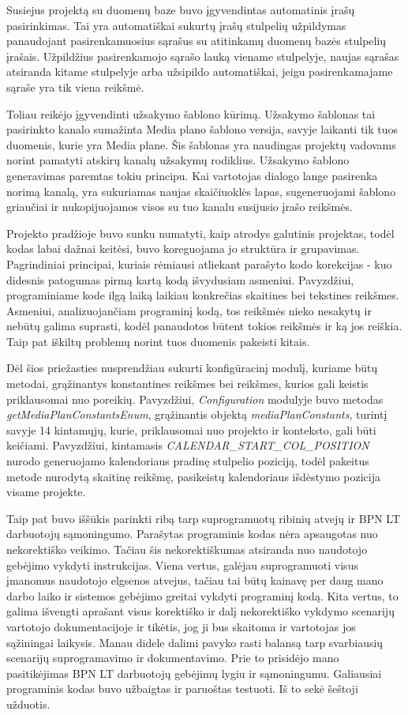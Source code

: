 \documentclass{VUMIFPSkursinis}
\begin{document}
Susiejus projektą su duomenų baze buvo įgyvendintas automatinis įrašų pasirinkimas. Tai yra automatiškai sukurtų įrašų stulpelių užpildymas panaudojant pasirenkamuosius sąrašus su atitinkamų duomenų bazės stulpelių įrašais. Užpildžius pasirenkamojo sąrašo lauką viename stulpelyje, naujas sąrašas atsiranda kitame stulpelyje arba užsipildo automatiškai, jeigu pasirenkamajame sąraše yra tik viena reikšmė. 

Toliau reikėjo įgyvendinti užsakymo šablono kūrimą. Užsakymo šablonas tai pasirinkto kanalo sumažinta Media plano šablono versija, savyje laikanti tik tuos duomenis, kurie yra Media plane. Šis šablonas yra naudingas projektų vadovams norint pamatyti atskirų kanalų užsakymų rodiklius. Užsakymo šablono generavimas paremtas tokiu principu. Kai vartotojas dialogo lange pasirenka norimą kanalą, yra sukuriamas naujas skaičiuoklės lapas, sugeneruojami šablono griaučiai ir nukopijuojamos visos su tuo kanalu susijusio įrašo reikšmės.

Projekto pradžioje buvo sunku numatyti, kaip atrodys galutinis projektas, todėl kodas labai dažnai keitėsi, buvo koreguojama jo struktūra ir grupavimas. Pagrindiniai principai, kuriais rėmiausi atliekant parašyto kodo korekcijas - kuo didesnis patogumas pirmą kartą kodą išvydusiam asmeniui. Pavyzdžiui, programiniame kode ilgą laiką laikiau konkrečias skaitines bei tekstines reikšmes. Asmeniui, analizuojančiam programinį kodą, tos reikšmės nieko nesakytų ir nebūtų galima suprasti, kodėl panaudotos būtent tokios reikšmės ir ką jos reiškia. Taip pat iškiltų problemų norint tuos duomenis pakeisti kitais.

Dėl šios priežasties nusprendžiau sukurti konfigūracinį modulį, kuriame būtų metodai, grąžinantys konstantines reikšmes bei reikšmes, kurios gali keistis priklausomai nuo poreikių. Pavyzdžiui, \textit{Configuration} modulyje buvo metodas \textit{getMediaPlanConstantsEnum}, grąžinantis objektą \textit{mediaPlanConstants}, turintį savyje 14 kintamųjų, kurie, priklausomai nuo projekto ir konteksto, gali būti keičiami. Pavyzdžiui, kintamasis \textit{CALENDAR\_START\_COL\_POSITION} nurodo generuojamo kalendoriaus pradinę stulpelio poziciją, todėl pakeitus metode nurodytą skaitinę reikšmę, pasikeistų kalendoriaus išdėstymo pozicija visame projekte.

Taip pat buvo iššūkis parinkti ribą tarp suprogramuotų ribinių atvejų ir BPN LT darbuotojų sąmoningumo. Parašytas programinis kodas nėra apsaugotas nuo nekorektiško veikimo. Tačiau šis nekorektiškumas atsiranda nuo naudotojo gebėjimo vykdyti instrukcijas. Viena vertus, galėjau suprogramuoti visus įmanomus naudotojo elgsenos atvejus, tačiau tai būtų kainavę per daug mano darbo laiko ir sistemos gebėjimo greitai vykdyti programinį kodą. Kita vertus, to galima išvengti aprašant visus korektiško ir dalį nekorektiško vykdymo scenarijų vartotojo dokumentacijoje ir tikėtis, jog ji bus skaitoma ir vartotojas jos sąžiningai laikysis. Manau didele dalimi pavyko rasti balansą tarp svarbiausių scenarijų suprogramavimo ir dokumentavimo. Prie to prisidėjo mano pasitikėjimas BPN LT darbuotojų gebėjimų lygiu ir sąmoningumu. Galiausiai programinis kodas buvo užbaigtas ir paruoštas testuoti. Iš to sekė šeštoji užduotis.
\end{document}
